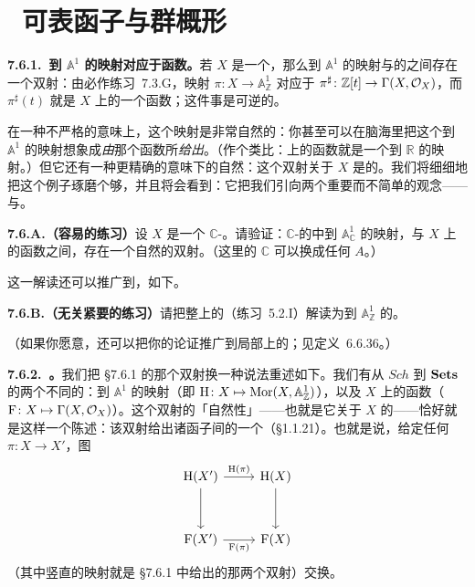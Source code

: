 
\section{\hard\ 可表函子与群概形}

\textbf{7.6.1.\ 到 $\mathbb{A}^1$ 的映射对应于函数。}\quad 若 $X$ 是一个\trScheme，那么到 $\mathbb{A}^1$ 的映射与\trStructureSheaf{}的\trGlobalSections{}之间存在一个双射：由必作练习~7.3.G，映射 $\pi\colon X\to\mathbb{A}^1_{\mathbb{Z}}$ 对应于\trRingMorphism{} $\pi^{\sharp}\colon\mathbb{Z}[t]\to\Gamma(X,\mathcal{O}_X)$，而 $\pi^{\sharp}(t)$ 就是 $X$ 上的一个函数；这件事是可逆的。

在一种不严格的意味上，这个映射是非常自然的：你甚至可以在脑海里把这个到 $\mathbb{A}^1$ 的映射想象成\emph{由}那个函数所\emph{给出}。（作个类比：\trManifold{}上的函数就是一个到 $\mathbb{R}$ 的映射。）但它还有一种更精确的意味下的自然：这个双射关于 $X$ 是\trFunctoriality{}的。我们将细细地把这个例子琢磨个够，并且将会看到：它把我们引向两个重要而不简单的观念——\trRepresentableFunctor{}与\trGroupScheme。

\textbf{7.6.A.（容易的练习）}\quad 设 $X$ 是一个 $\mathbb{C}$-\trScheme。请验证：$\mathbb{C}$-\trScheme{}的\trCategory{}中到 $\mathbb{A}^1_{\mathbb{C}}$ 的映射，与 $X$ 上的函数之间，存在一个自然的双射。（这里的\trBaseRing{} $\mathbb{C}$ 可以换成任何\trRing{} $A$。）

这一解读还可以推广到\trRationalMap，如下。

\textbf{7.6.B.（无关紧要的练习）}\quad 请把整\trScheme{}上的\trRationalFunction（\mbox{练习~5.2.I}）解读为到 $\mathbb{A}^1_{\mathbb{Z}}$ 的\trRationalMap。

（如果你愿意，还可以把你的论证推广到局部\trNoetherian{}\trScheme{}上的\trRationalMap；见定义~6.6.36。）

\textbf{7.6.2.\ \trRepresentableFunctor。}\quad 我们把 \S7.6.1 的那个双射换一种说法重述如下。我们有从 $\mathit{Sch}$ 到 $\mathbf{Sets}$ 的两个不同的\trContravariantFunctor：到 $\mathbb{A}^1$ 的映射（即 $\mathrm{H}\colon X\mapsto\operatorname{Mor}(X,\mathbb{A}^1_{\mathbb{Z}})$），以及 $X$ 上的函数（$\mathrm{F}\colon X\mapsto\Gamma(X,\mathcal{O}_X)$）。这个双射的「自然性」——也就是它关于 $X$ 的\trFunctoriality——恰好就是这样一个陈述：该双射给出诸函子间的一个\trNaturalIsomorphism（\S1.1.21）。也就是说，给定任何 $\pi\colon X\to X'$，图
\[
\begin{tikzcd}[row sep=3.2em]
\mathrm{H}(X') \ar[r, "\mathrm{H}(\pi)"] \ar[d] & \mathrm{H}(X) \ar[d] \\
\mathrm{F}(X') \ar[r, "\mathrm{F}(\pi)"'] & \mathrm{F}(X)
\end{tikzcd}
\]
（其中竖直的映射就是 \S7.6.1 中给出的那两个双射）交换。

